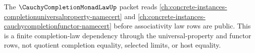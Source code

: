 The $\CauchyCompletionMonadLawUp$ packet reads \autoref{ch:concrete-instances-completionuniversalproperty-namecert} and \autoref{ch:concrete-instances-cauchycompletionfunctor-namecert} before associativity law rows are public. This is a finite completion-law dependency through the universal-property and functor rows, not quotient completion equality, selected limits, or host equality.
